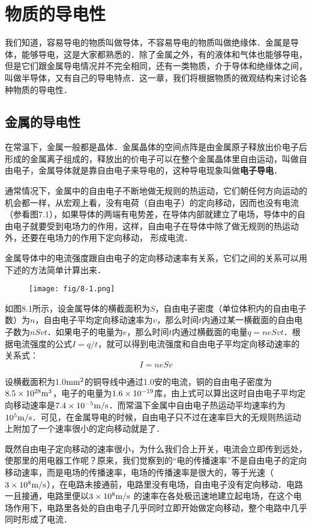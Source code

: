 \chapter{物质的导电性}

我们知道，容易导电的物质叫做导体，不容易导电的物质叫做绝缘体．金属是导体，能够导电，这是大家都熟悉的．除了金属之外，有的液体和气体也能够导电，但是它们跟金属导电情况并不完全相同，还有一类物质，介于导体和绝缘体之间，叫做半导体，又有自己的导电特点．这一章，我们将根据物质的微观结构来讨论各种物质的导电性．

\section{金属的导电性}

在常温下，金属一般都是晶体．金属晶体的空间点阵是由金属原子释放出价电子后形成的金属离子组成的，释放出的价电子可以在整个金属晶体里自由运动，叫做自由电子，金属导体就是靠自由电子来导电的，这种导电现象叫做\textbf{电子导电}．


通常情况下，金属中的自由电子不断地做无规则的热运动，它们朝任何方向运动的机会都一样，从宏观上看，没有电荷（自由电子）的定向移动，因而也没有电流（参看图7.1），如果导体的两端有电势差，在导体内部就建立了电场，导体中的自由电子就要受到电场力的作用，这样，自由电子在导体中除了做无规则的热运动外，还要在电场力的作用下定向移动，
形成电流．

金属导体中的电流强度跟自由电子的定向移动速率有关系，它们之间的关系可以用下述的方法简单计算出来．
\begin{figure}[htp]\centering
    \texttt{[image: fig/8-1.png]}
    \caption{}
    \end{figure}

如图8.1所示，设金属导体的横截面积为$S$，自由电子密度（单位体积内的自由电子数）为$n$，自由电子平均定向移动速率为$v$，那么时间$t$内通过某一横截面的自由电子数为$nSvt$．如果电子的电量为$e$，那么时间$t$内通过横截面的电量$q=neSvt$．根据电流强度的公式$I=q/t$，就可以得到电流强度和自由电子平均定向移动速率的关系式：
\[I=neSv\]

设横截面积为1.0${\rm mm}^2$的铜导线中通过1.0安的电流，铜的自由电子密度为$8.5\times10^{28}{\rm m}^3$，电子的电量为$1.6\times10^{-19}$库，由上式可以算出这时自由电子平均定向移动速率是$7. 4\times10^{-5}\text{m}/\text{s}$．而常温下金属中自由电子热运动平均速率约为$10^5\text{m}/\text{s}$．可见，在金属导电的时候，自由电子只不过在速率巨大的无规则热运动上附加了一个速率很小的定向移动就是了．

既然自由电子定向移动的速率很小，为什么我们合上开关，电流会立即传到远处，使那里的用电器工作呢？原来，我们觉察到的“电的传播速率”不是自由电子的定向移动速率，而是电场的传播速率，电场的传播速率是很大的，等于光速（$3\times10^8\text{m}/\text{s}$），在电路未接通前，电路里没有电场，自由电子没有定向移动．电路一且接通，电路里便以$3\times10^8\text{m}/\text{s}$
的速率在各处极迅速地建立起电场，在这个电场作用下，电路里各处的自由电子几乎同时立即开始做定向移动，整个电路中几乎同时形成了电流．

